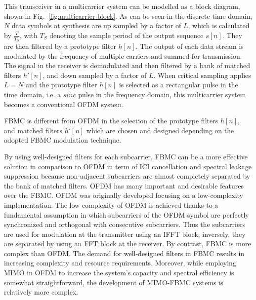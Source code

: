 This transceiver in a multicarrier system can be modelled as a block diagram, shown in Fig.~\ref{fig:multicarrier-block}.
As can be seen in the discrete-time domain, $N$ data symbols at synthesis are up sampled by a factor of $L$, which is calculated by $\frac{T}{T_{S}}$, with $T_{S}$ denoting the sample period of the output sequence $s[n]$. They are then filtered by a prototype filter $h[n]$. The output of each data stream is modulated by the frequency of multiple carriers and summed for transmission.
The signal in the receiver is demodulated and then filtered by a bank of matched filters $h'[n]$, and down sampled by a factor of $L$.
When critical sampling applies $L = N$ and the prototype filter $h[n]$ is selected as a rectangular pulse in the time domain, i.e. a $sinc$ pulse in the frequency domain, this multicarrier system becomes a conventional OFDM system.

FBMC is different from OFDM in the selection of the prototype filters $h[n]$, and matched filters $h'[n]$ which are chosen and designed depending on the adopted FBMC modulation technique.

By using well-designed filters for each subcarrier, FBMC can be a more effective solution in comparison to OFDM in term of ICI cancellation and spectral leakage suppression because non-adjacent subcarriers are almost completely separated by the bank of matched filters.
OFDM has many important and desirable features over the FBMC. OFDM was originally developed focusing on a low-complexity implementation. The low complexity of OFDM is achieved thanks to a fundamental assumption in which subcarriers of the OFDM symbol are perfectly synchronized and orthogonal with consecutive subcarriers. Thus the subcarriers are used for modulation at the transmitter using an IFFT block; inversely, they are separated by using an FFT block at the receiver. By contrast, FBMC is more complex than OFDM. The demand for well-designed filters in FBMC results in increasing complexity and resource requirements.
Moreover, while employing MIMO in OFDM to increase the system's capacity and spectral efficiency is somewhat straightforward, the development of MIMO-FBMC systems is relatively more complex.

